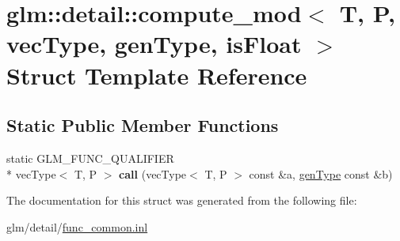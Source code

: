 \hypertarget{structglm_1_1detail_1_1compute__mod}{\section{glm\-:\-:detail\-:\-:compute\-\_\-mod$<$ T, P, vec\-Type, gen\-Type, is\-Float $>$ Struct Template Reference}
\label{structglm_1_1detail_1_1compute__mod}
}
\subsection*{Static Public Member Functions}
\begin{DoxyCompactItemize}
\item 
\hypertarget{structglm_1_1detail_1_1compute__mod_aba5cd74efc662d8f611d71f2f5d12de1}{static G\-L\-M\-\_\-\-F\-U\-N\-C\-\_\-\-Q\-U\-A\-L\-I\-F\-I\-E\-R \\*
vec\-Type$<$ T, P $>$ {\bfseries call} (vec\-Type$<$ T, P $>$ const \&a, \hyperlink{structglm_1_1detail_1_1genType}{gen\-Type} const \&b)}\label{structglm_1_1detail_1_1compute__mod_aba5cd74efc662d8f611d71f2f5d12de1}

\end{DoxyCompactItemize}


The documentation for this struct was generated from the following file\-:\begin{DoxyCompactItemize}
\item 
glm/detail/\hyperlink{func__common_8inl}{func\-\_\-common.\-inl}\end{DoxyCompactItemize}
